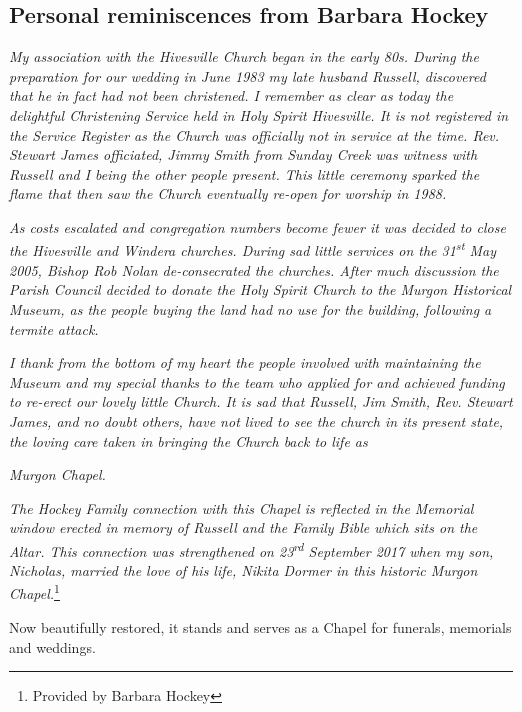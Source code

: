 \subsection{Personal reminiscences from Barbara Hockey}



\emph{My association with the Hivesville Church began in the early 80s. During the preparation for our wedding in June 1983 my late husband Russell, discovered that he in fact had not been christened. I remember as clear as today the delightful Christening Service held in Holy Spirit Hivesville. It is not registered in the Service Register as the Church was officially not in service at the time. Rev. Stewart James officiated, Jimmy Smith from Sunday Creek was witness with Russell and I being the other people present. This little ceremony sparked the flame that then saw the Church eventually re-open for worship in 1988.}



\emph{As costs escalated and congregation numbers become fewer it was decided to close the Hivesville and Windera churches. During sad little services on the 31\textsuperscript{st} May 2005, Bishop Rob Nolan de-consecrated the churches. After much discussion the Parish Council decided to donate the Holy Spirit Church to the Murgon Historical Museum, as the people buying the land had no use for the building, following a termite attack.}



\emph{I thank from the bottom of my heart the people involved with maintaining the Museum and my special thanks to the team who applied for and achieved funding to re-erect our lovely little Church. It is sad that Russell, Jim Smith, Rev. Stewart James, and no doubt others, have not lived to see the church in its present state, the loving care taken in bringing the Church back to life as}



\emph{Murgon Chapel.}



\emph{The Hockey Family connection with this Chapel is reflected in the Memorial window erected in memory of Russell and the Family Bible which sits on the Altar. This connection was strengthened on 23\textsuperscript{rd} September 2017 when my son, Nicholas, married the love of his life, Nikita Dormer in this historic Murgon Chapel.}\footnote{Provided by Barbara Hockey}


\medskip


Now beautifully restored, it stands and serves as a Chapel for funerals, memorials and weddings.



